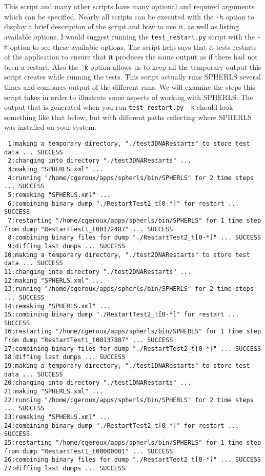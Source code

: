 \documentclass[12pt,a4paper]{book}
\begin{document}
This script and many other scripts have many optional and required arguments which can be specified. Nearly all scripts can be executed with the {\tt -h} option to display a brief description of the script and how to use it, as well as listing available options. I would suggest running the {\tt test\_restart.py} script with the {\tt -h} option to see these available options. The script help says that it tests restarts of the application to ensure that it produces the same output as if there had not been a restart. Also the {\tt -k} option allows us to keep all the temporary output this script creates while running the tests. This script actually runs SPHERLS several times and compares output of the different runs. We will examine the steps this script takes in order to illustrate some aspects of working with SPHERLS. The output that is generated when you run {\tt test\_restart.py -k} should look something like that below, but with different paths reflecting where SPHERLS was installed on your system.

{\tiny
\begin{verbatim}
 1:making a temporary directory, "./test3DNARestarts" to store test data ... SUCCESS
 2:changing into directory "./test3DNARestarts" ...
 3:making "SPHERLS.xml" ...
 4:running "/home/cgeroux/apps/spherls/bin/SPHERLS" for 2 time steps ... SUCCESS
 5:remaking "SPHERLS.xml" ...
 6:combining binary dump "./RestartTest2_t[0-*]" for restart ... SUCCESS
 7:restarting "/home/cgeroux/apps/spherls/bin/SPHERLS" for 1 time step from dump "RestartTest1_t00172487" ... SUCCESS
 8:combining binary files for dump "./RestartTest2_t[0-*]" ... SUCCESS
 9:diffing last dumps ... SUCCESS
10:making a temporary directory, "./test2DNARestarts" to store test data ... SUCCESS
11:changing into directory "./test2DNARestarts" ...
12:making "SPHERLS.xml" ...
13:running "/home/cgeroux/apps/spherls/bin/SPHERLS" for 2 time steps ... SUCCESS
14:remaking "SPHERLS.xml" ...
15:combining binary dump "./RestartTest2_t[0-*]" for restart ... SUCCESS
16:restarting "/home/cgeroux/apps/spherls/bin/SPHERLS" for 1 time step from dump "RestartTest1_t00137887" ... SUCCESS
17:combining binary files for dump "./RestartTest2_t[0-*]" ... SUCCESS
18:diffing last dumps ... SUCCESS
19:making a temporary directory, "./test1DNARestarts" to store test data ... SUCCESS
20:changing into directory "./test1DNARestarts" ...
21:making "SPHERLS.xml" ...
22:running "/home/cgeroux/apps/spherls/bin/SPHERLS" for 2 time steps ... SUCCESS
23:remaking "SPHERLS.xml" ...
24:combining binary dump "./RestartTest2_t[0-*]" for restart ... SUCCESS
25:restarting "/home/cgeroux/apps/spherls/bin/SPHERLS" for 1 time step from dump "RestartTest1_t00000001" ... SUCCESS
26:combining binary files for dump "./RestartTest2_t[0-*]" ... SUCCESS
27:diffing last dumps ... SUCCESS
\end{verbatim}
}
\end{document}

